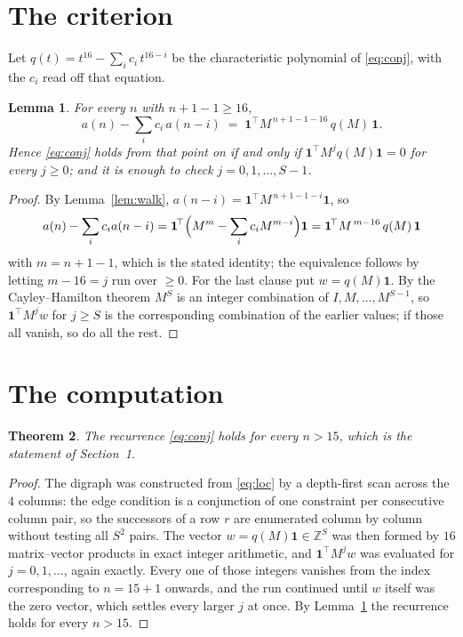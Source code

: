 \documentclass[11pt,a4paper]{article}
\theoremstyle{plain}
\newtheorem{theorem}{Theorem}
\newtheorem{lemma}[theorem]{Lemma}
\theoremstyle{definition}
\begin{document}
\section{The criterion}

Let $q(t)=t^{16}-\sum_i c_i\,t^{16-i}$ be the characteristic polynomial of
\eqref{eq:conj}, with the $c_i$ read off that equation.

\begin{lemma}\label{lem:crit}
For every $n$ with $n+1-1\ge16$,
\[
a(n)-\sum_i c_i\,a(n-i)\;=\;\mathbf{1}^{\!\top}M^{\,n+1-1-16}\,q(M)\,\mathbf{1} .
\]
Hence \eqref{eq:conj} holds from that point on if and only if
$\mathbf{1}^{\!\top}M^{j}q(M)\mathbf{1}=0$ for every $j\ge0$; and it is enough to check
$j=0,1,\dots,S-1$.
\end{lemma}

\begin{proof}
By Lemma~\ref{lem:walk}, $a(n-i)=\mathbf{1}^{\!\top}M^{\,n+1-1-i}\mathbf{1}$, so
\[
a(n)-\sum_i c_i a(n-i)
=\mathbf{1}^{\!\top}\Bigl(M^{m}-\sum_i c_i M^{m-i}\Bigr)\mathbf{1}
=\mathbf{1}^{\!\top}M^{\,m-16}\,q(M)\,\mathbf{1}
\]
with $m=n+1-1$, which is the stated identity; the equivalence follows by letting
$m-16=j$ run over $\ge0$. For the last clause put $w=q(M)\mathbf{1}$. By the
Cayley--Hamilton theorem $M^{S}$ is an integer combination of $I,M,\dots,M^{S-1}$, so
$\mathbf{1}^{\!\top}M^{j}w$ for $j\ge S$ is the corresponding combination of the earlier
values; if those all vanish, so do all the rest.
\end{proof}

\section{The computation}

\begin{theorem}
The recurrence \eqref{eq:conj} holds for every $n>15$, which is the statement of
Section~1.
\end{theorem}

\begin{proof}
The digraph was constructed from \eqref{eq:loc} by a depth-first scan across the $4$
columns: the edge condition is a conjunction of one constraint per consecutive column
pair, so the successors of a row $r$ are enumerated column by column without testing all
$S^2$ pairs. The vector $w=q(M)\mathbf{1}\in\mathbb{Z}^{S}$ was then formed by $16$
matrix--vector products in exact integer arithmetic, and $\mathbf{1}^{\!\top}M^{j}w$ was
evaluated for $j=0,1,\dots$, again exactly. Every one of those integers vanishes from the
index corresponding to $n=15+1$ onwards, and the run continued until $w$ itself was the
zero vector, which settles every larger $j$ at once. By Lemma~\ref{lem:crit} the recurrence
holds for every $n>15$.
\end{proof}
\end{document}
